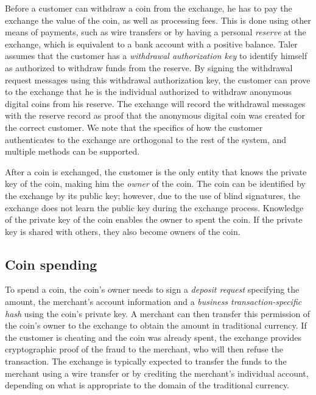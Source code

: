 \documentclass{llncs}
\begin{document}
Before a customer can withdraw a coin from the exchange,
he has to pay the exchange the value of the coin, as well as processing fees.
This is done using other means of payments, such as wire transfers or
by having a personal {\em reserve} at the exchange,
 which is equivalent to a bank account with a positive balance.
Taler assumes that the customer has a {\em withdrawal authorization key}
to identify himself as authorized to withdraw funds from the reserve.
By signing the withdrawal request messages using this withdrawal
authorization key, the customer can prove to the exchange that he is the
individual authorized to withdraw anonymous digital coins from his reserve.
The exchange will record the withdrawal messages with the reserve record as
proof that the anonymous digital coin was created for the correct
customer.  We note that the specifics of how the customer authenticates
to the exchange are orthogonal to the rest of the system, and
 multiple methods can be supported.

After a coin is exchanged, the customer is the only entity that knows the
private key of the coin, making him the \emph{owner} of the coin.
The coin can be identified by the exchange by its public key; however, due
to the use of blind signatures, the exchange does not learn the public key
during the exchange process.  Knowledge of the private key of the coin
enables the owner to spent the coin.  If the private key is shared
with others, they also become owners of the coin.


\subsection{Coin spending}

To spend a coin, the coin's owner needs to sign a {\em deposit
  request} specifying the amount, the merchant's account information
and a {\em business transaction-specific hash} using the coin's
private key.  A merchant can then transfer this permission of the
coin's owner to the exchange to obtain the amount in traditional currency.
If the customer is cheating and the coin was already spent, the exchange
provides cryptographic proof of the fraud to the merchant, who will
then refuse the transaction.  The exchange is typically expected to
transfer the funds to the merchant using a wire transfer or by
crediting the merchant's individual account, depending on what is
appropriate to the domain of the traditional currency.
\end{document}
